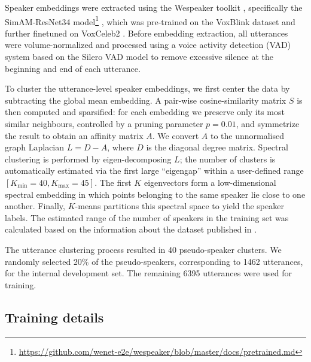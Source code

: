 \documentclass{article}
\begin{document}
Speaker embeddings were extracted using the Wespeaker toolkit \cite{wang2023wespeaker, wang2024advancing}, specifically the SimAM-ResNet34 model\footnote{\url{https://github.com/wenet-e2e/wespeaker/blob/master/docs/pretrained.md}} \cite{qin2022simple}, which was pre-trained on the VoxBlink dataset \cite{lin2024voxblink2100kspeakerrecognition} and further finetuned on VoxCeleb2 \cite{chung2018voxceleb2}. Before embedding extraction, all utterances were volume-normalized and processed using a voice activity detection (VAD) system based on the Silero VAD model \cite{SileroVAD} to remove excessive silence at the beginning and end of each utterance.

To cluster the utterance-level speaker embeddings, we first center the data by subtracting the global mean embedding.   A pair-wise cosine-similarity matrix \(S\) is then computed and sparsified: for each embedding we preserve only its most similar neighbours, controlled by a pruning parameter \(p=0.01\), and symmetrize the result to obtain an affinity matrix \(A\). We convert \(A\) to the unnormalised graph Laplacian \(L = D - A\), where \(D\) is the diagonal degree matrix. Spectral clustering is performed by eigen-decomposing \(L\); the number of clusters is automatically estimated via the first large ``eigengap'' within a user-defined range \([K_{\min}=40, K_{\max}=45]\). The first \(K\) eigenvectors form a low-dimensional spectral embedding in which points belonging to the same speaker lie close to one another. Finally, \(K\)-means partitions this spectral space to yield the speaker labels. The estimated range of the number of speakers in the training set was calculated based on the information about the dataset published in \cite{olstad-etal-2024-collecting}.

The utterance clustering process resulted in 40 pseudo-speaker clusters. We randomly selected 20\% of the pseudo-speakers, corresponding to 1462 utterances, for the internal development set. The remaining 6395 utterances were used for training.



\subsection{Training details}
\end{document}
